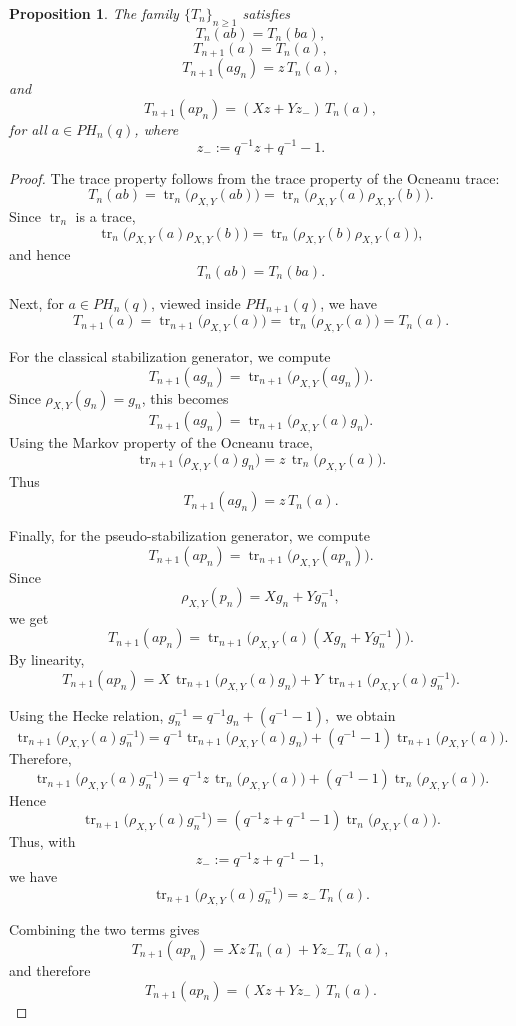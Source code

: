 \documentclass[11pt]{article}
\numberwithin{equation}{section}
\newtheorem{proposition}[theorem]{Proposition}
\theoremstyle{definition}
\begin{document}
\begin{proposition}
The family \(\{T_n\}_{n\geq 1}\) satisfies
\[
T_n(ab)=T_n(ba),
\]
\[
T_{n+1}(a)=T_n(a),
\]
\[
T_{n+1}(a g_n)=z\,T_n(a),
\]
and
\[
T_{n+1}(a p_n)=(Xz+Yz_-)\,T_n(a),
\]
for all \(a\in PH_n(q)\), where
\[
z_-:=q^{-1}z+q^{-1}-1.
\]
\end{proposition}

\begin{proof}
The trace property follows from the trace property of the Ocneanu trace:
\[
T_n(ab)
=
\operatorname{tr}_n\big(\rho_{X,Y}(ab)\big)
=
\operatorname{tr}_n\big(\rho_{X,Y}(a)\rho_{X,Y}(b)\big).
\]
Since \(\operatorname{tr}_n\) is a trace,
\[
\operatorname{tr}_n\big(\rho_{X,Y}(a)\rho_{X,Y}(b)\big)
=
\operatorname{tr}_n\big(\rho_{X,Y}(b)\rho_{X,Y}(a)\big),
\]
and hence
\[
T_n(ab)=T_n(ba).
\]

\noindent Next, for \(a\in PH_n(q)\), viewed inside \(PH_{n+1}(q)\), we have
\[
T_{n+1}(a)
=
\operatorname{tr}_{n+1}\big(\rho_{X,Y}(a)\big)
=
\operatorname{tr}_n\big(\rho_{X,Y}(a)\big)
=
T_n(a).
\]

\noindent For the classical stabilization generator, we compute
\[
T_{n+1}(a g_n)
=
\operatorname{tr}_{n+1}\big(\rho_{X,Y}(a g_n)\big).
\]
Since \(\rho_{X,Y}(g_n)=g_n\), this becomes
\[
T_{n+1}(a g_n)
=
\operatorname{tr}_{n+1}\big(\rho_{X,Y}(a)g_n\big).
\]
Using the Markov property of the Ocneanu trace,
\[
\operatorname{tr}_{n+1}\big(\rho_{X,Y}(a)g_n\big)
=
z\,\operatorname{tr}_n\big(\rho_{X,Y}(a)\big).
\]
Thus
\[
T_{n+1}(a g_n)=z\,T_n(a).
\]

Finally, for the pseudo-stabilization generator, we compute
\[
T_{n+1}(a p_n)
=
\operatorname{tr}_{n+1}\big(\rho_{X,Y}(a p_n)\big).
\]
Since
\[
\rho_{X,Y}(p_n)=Xg_n+Yg_n^{-1},
\]
we get
\[
T_{n+1}(a p_n)
=
\operatorname{tr}_{n+1}\big(\rho_{X,Y}(a)(Xg_n+Yg_n^{-1})\big).
\]
By linearity,
\[
T_{n+1}(a p_n)
=
X\,\operatorname{tr}_{n+1}\big(\rho_{X,Y}(a)g_n\big)
+
Y\,\operatorname{tr}_{n+1}\big(\rho_{X,Y}(a)g_n^{-1}\big).
\]

\noindent Using the Hecke relation, \(g_n^{-1}=q^{-1}g_n+(q^{-1}-1),\) we obtain
\[
\operatorname{tr}_{n+1}\big(\rho_{X,Y}(a)g_n^{-1}\big)
=
q^{-1}\operatorname{tr}_{n+1}\big(\rho_{X,Y}(a)g_n\big)
+
(q^{-1}-1)\operatorname{tr}_{n+1}\big(\rho_{X,Y}(a)\big).
\]
Therefore,
\[
\operatorname{tr}_{n+1}\big(\rho_{X,Y}(a)g_n^{-1}\big)
=
q^{-1}z\,\operatorname{tr}_n\big(\rho_{X,Y}(a)\big)
+
(q^{-1}-1)\operatorname{tr}_n\big(\rho_{X,Y}(a)\big).
\]
Hence
\[
\operatorname{tr}_{n+1}\big(\rho_{X,Y}(a)g_n^{-1}\big)
=
\left(q^{-1}z+q^{-1}-1\right)
\operatorname{tr}_n\big(\rho_{X,Y}(a)\big).
\]
Thus, with
\[
z_-:=q^{-1}z+q^{-1}-1,
\]
we have
\[
\operatorname{tr}_{n+1}\big(\rho_{X,Y}(a)g_n^{-1}\big)
=
z_-\,T_n(a).
\]

Combining the two terms gives
\[
T_{n+1}(a p_n)
=
Xz\,T_n(a)+Yz_-\,T_n(a),
\]
and therefore
\[
T_{n+1}(a p_n)
=
(Xz+Yz_-)\,T_n(a).
\]
\end{proof}
\end{document}
